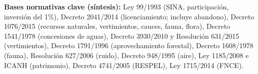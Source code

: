 \textbf{Bases normativas clave (síntesis):} Ley 99/1993 (SINA, participación, inversión del 1\%), Decreto 2041/2014 (licenciamiento; incluye abandono), Decreto 1076/2015 (recursos naturales, vertimientos, cauces, fauna, flora), Decreto 1541/1978 (concesiones de aguas), Decreto 3930/2010 y Resolución 631/2015 (vertimientos), Decreto 1791/1996 (aprovechamiento forestal), Decreto 1608/1978 (fauna), Resolución 627/2006 (ruido), Decreto 948/1995 (aire), Ley 1185/2008 e ICANH (patrimonio), Decreto 4741/2005 (RESPEL), Ley 1715/2014 (FNCE).

